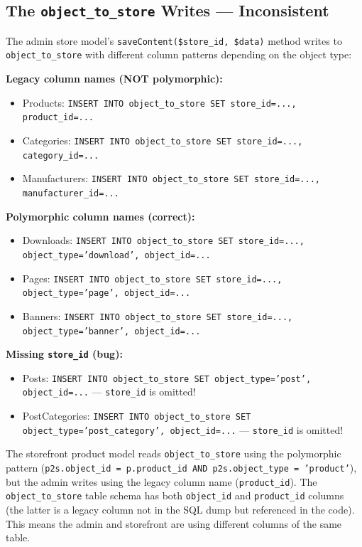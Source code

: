 \documentclass[11pt,a4paper]{article}
\begin{document}
\subsection{The \texttt{object\_to\_store} Writes --- Inconsistent}

\begin{findingbox}
The admin store model's \texttt{saveContent(\$store\_id, \$data)}
method writes to \texttt{object\_to\_store} with different column
patterns depending on the object type:

\textbf{Legacy column names (NOT polymorphic):}
\begin{itemize}[leftmargin=1.6em,itemsep=2pt]
  \item Products: \texttt{INSERT INTO object\_to\_store SET store\_id=..., product\_id=...}
  \item Categories: \texttt{INSERT INTO object\_to\_store SET store\_id=..., category\_id=...}
  \item Manufacturers: \texttt{INSERT INTO object\_to\_store SET store\_id=..., manufacturer\_id=...}
\end{itemize}

\textbf{Polymorphic column names (correct):}
\begin{itemize}[leftmargin=1.6em,itemsep=2pt]
  \item Downloads: \texttt{INSERT INTO object\_to\_store SET store\_id=..., object\_type='download', object\_id=...}
  \item Pages: \texttt{INSERT INTO object\_to\_store SET store\_id=..., object\_type='page', object\_id=...}
  \item Banners: \texttt{INSERT INTO object\_to\_store SET store\_id=..., object\_type='banner', object\_id=...}
\end{itemize}

\textbf{Missing \texttt{store\_id} (bug):}
\begin{itemize}[leftmargin=1.6em,itemsep=2pt]
  \item Posts: \texttt{INSERT INTO object\_to\_store SET object\_type='post', object\_id=...} --- \texttt{store\_id} is omitted!
  \item PostCategories: \texttt{INSERT INTO object\_to\_store SET object\_type='post\_category', object\_id=...} --- \texttt{store\_id} is omitted!
\end{itemize}

The storefront product model reads
\texttt{object\_to\_store} using the polymorphic pattern
(\texttt{p2s.object\_id = p.product\_id AND p2s.object\_type =
'product'}), but the admin writes using the legacy column name
(\texttt{product\_id}). The \texttt{object\_to\_store} table schema
has both \texttt{object\_id} and \texttt{product\_id} columns (the
latter is a legacy column not in the SQL dump but referenced in
the code). This means the admin and storefront are using different
columns of the same table.
\end{findingbox}
\end{document}
